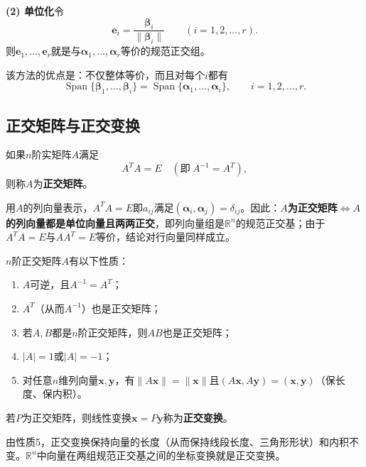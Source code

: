 \textbf{(2) 单位化}\quad 令
\[
\boldsymbol{e}_i=\frac{\boldsymbol{\beta}_i}{\|\boldsymbol{\beta}_i\|}\qquad(i=1,2,\dots,r).
\]
则$\boldsymbol{e}_1,\dots,\boldsymbol{e}_r$就是与$\boldsymbol{\alpha}_1,\dots,\boldsymbol{\alpha}_r$等价的规范正交组。

该方法的优点是：不仅整体等价，而且对每个$i$都有
\[
\operatorname{Span}\{\boldsymbol{\beta}_1,\dots,\boldsymbol{\beta}_i\}=\operatorname{Span}\{\boldsymbol{\alpha}_1,\dots,\boldsymbol{\alpha}_i\},
\qquad i=1,2,\dots,r .
\]

\subsection{正交矩阵与正交变换}
\begin{definition}[正交矩阵]
如果$n$阶实矩阵$A$满足
\[
A^{T}A=E\quad(\text{即}\ A^{-1}=A^{T}),
\]
则称$A$为\textbf{正交矩阵}。
\end{definition}

用$A$的列向量表示，$A^{T}A=E$即$a_{ij}$满足$(\boldsymbol{\alpha}_i,\boldsymbol{\alpha}_j)=\delta_{ij}$。因此：\textbf{$A$为正交矩阵$\iff$$A$的列向量都是单位向量且两两正交}，即列向量组是$\mathbb{R}^{n}$的规范正交基；由于$A^{T}A=E$与$AA^{T}=E$等价，结论对行向量同样成立。

$n$阶正交矩阵$A$有以下性质：
\begin{enumerate}
    \item $A$可逆，且$A^{-1}=A^{T}$；
    \item $A^{T}$（从而$A^{-1}$）也是正交矩阵；
    \item 若$A,B$都是$n$阶正交矩阵，则$AB$也是正交矩阵；
    \item $|A|=1$或$|A|=-1$；
    \item 对任意$n$维列向量$\boldsymbol{x},\boldsymbol{y}$，有$\|A\boldsymbol{x}\|=\|\boldsymbol{x}\|$且$(A\boldsymbol{x},A\boldsymbol{y})=(\boldsymbol{x},\boldsymbol{y})$（保长度、保内积）。
\end{enumerate}

\begin{definition}[正交变换]
若$P$为正交矩阵，则线性变换$\boldsymbol{x}=P\boldsymbol{y}$称为\textbf{正交变换}。
\end{definition}

由性质5，正交变换保持向量的长度（从而保持线段长度、三角形形状）和内积不变。$\mathbb{R}^{n}$中向量在两组规范正交基之间的坐标变换就是正交变换。


